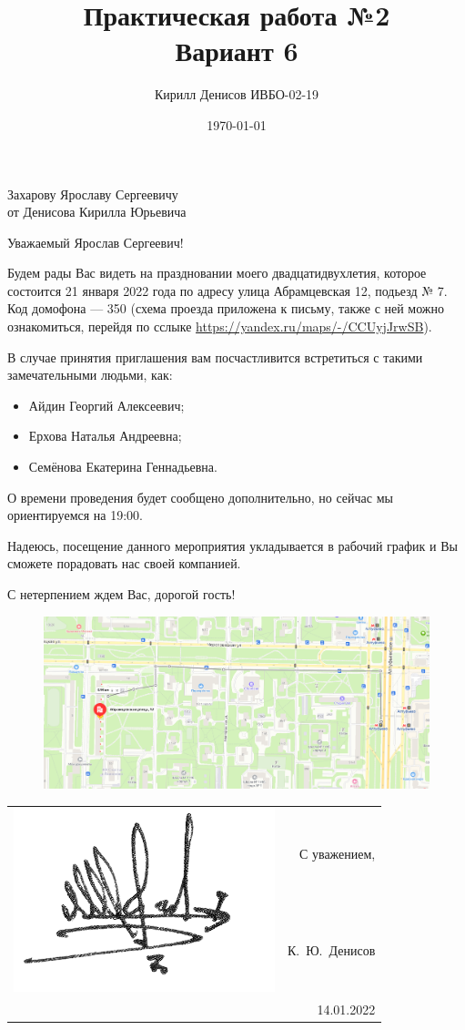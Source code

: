 \documentclass[a4paper,14pt]{extarticle}
\author{Кирилл Денисов ИВБО-02-19}
\title{Практическая работа №2\\Вариант 6}
\date{\today}
\begin{document}
	\thispagestyle{empty}

\begin{flushright}
	Захарову Ярославу Сергеевичу\\
	от Денисова Кирилла Юрьевича
\end{flushright}
\vspace{4em}

Уважаемый Ярослав Сергеевич!

Будем рады Вас видеть на праздновании моего двадцатидвухлетия, которое состоится 21 января 2022 года по адресу улица Абрамцевская 12, подьезд № 7. Код домофона --- 350 (схема проезда приложена к письму, также с ней можно ознакомиться, перейдя по сслыке \href{https://yandex.ru/maps/-/CCUyjJrwSB}{{https://yandex.ru/maps/-/CCUyjJrwSB}}).



В случае принятия приглашения вам посчастливится встретиться с такими замечательными людьми, как:
\begin{itemize}
	\item Айдин Георгий Алексеевич;
	\item Ерхова Наталья Андреевна;
	\item Семёнова Екатерина Геннадьевна.
\end{itemize}

О времени проведения будет сообщено дополнительно, но сейчас мы ориентируемся на 19:00.

Надеюсь, посещение данного мероприятия укладывается в рабочий график и Вы сможете порадовать нас своей компанией. 

С нетерпением ждем Вас, дорогой гость!



\begin{figure}[h!]
	\centering
	\includegraphics[width=0.8\linewidth]{screenshot001}

\end{figure}


\begin{flushright}
	\begin{tabular}{cr}
			\multirow{2}{*}{\includegraphics[width=0.14\linewidth]{../../../Common/denisov-signature}}&  С уважением,\\
	&
		К.~Ю.~Денисов\\
		& 14.01.2022\\
	\end{tabular}
	
	
	
\end{flushright}
\end{document}

